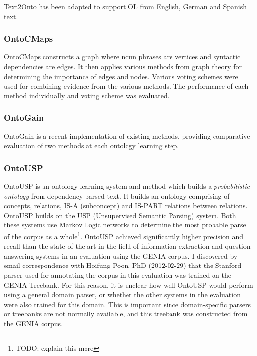 \documentclass[a4paper]{report}
\newcommand{\todo}[1]{\footnote{{\color{red} TODO: #1}}}
\begin{document}
Text2Onto has been adapted to support OL from English, German and Spanish text.

\subsubsection{OntoCMaps}

OntoCMaps constructs a graph where noun phrases are vertices and syntactic dependencies are edges.
It then applies various methods from graph theory for determining the importance of edges and nodes.
Various voting schemes were used for combining evidence from the various methods.
The performance of each method individually and voting scheme was evaluated.

\subsubsection{OntoGain}
\label{sec:background:ontogain}

OntoGain is a recent implementation of existing methods, providing comparative evaluation of two methods at each ontology learning step.

\subsubsection{OntoUSP}

OntoUSP is an ontology learning system and method which builds a \emph{probabilistic ontology} from dependency-parsed text\cite{Poon2010OntoUSP}.
It builds an ontology comprising of concepts, relations, IS-A (subconcept) and IS-PART relations between relations.
OntoUSP builds on the USP (Unsupervised Semantic Parsing) system\cite{Poon09USP}.
Both these systems use Markov Logic networks to determine the most probable parse of the corpus as a whole\todo{explain this more}.
OntoUSP achieved significantly higher precision and recall than the state of the art in the field of information extraction and question answering systems in an evaluation using the GENIA\citep{KimEtAl03GeniaCorpus} corpus\cite{Poon2010OntoUSP}.
I discovered by email correspondence with Hoifung Poon, PhD (2012-02-29) that the Stanford parser\cite{Klein03PCFGParser} used for annotating the corpus in this evaluation was trained on the GENIA Treebank\cite{Tatseisi05GENIATB}.
For this reason, it is unclear how well OntoUSP would perform using a general domain parser, or whether the other systems in the evaluation were also trained for this domain.
This is important since domain-specific parsers or treebanks are not normally available, and this treebank was constructed from the GENIA corpus.
\end{document}
